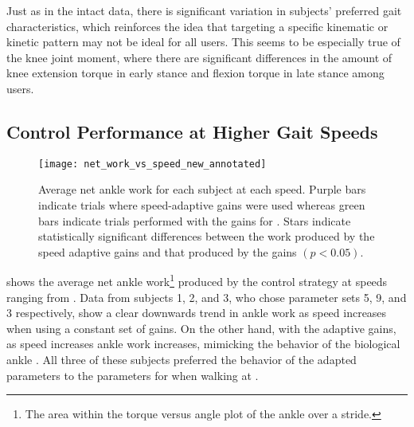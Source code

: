 Just as in the intact data, there is significant variation in subjects'
preferred gait characteristics, which reinforces the idea that targeting a
specific kinematic or kinetic pattern may not be ideal for all users. This seems
to be especially true of the knee joint moment, where there are significant
differences in the amount of knee extension torque in early stance and flexion
torque in late stance among users. 

\begin{comment}
We found that most subjects produced relatively little ankle dorsiflexion as
they walked. Consequently, for most subjects the neuromuscular model control
produced less ankle plantarflexion torque than is average for able-bodied
subjects.  We believe the low level of ankle dorsiflexion was caused by the
relatively short foot of the prosthesis, which we plan to rectify for future
experiments. However, this effect also betrays a potential weakness of the
approach: optimizing to match able-bodied kinetics given able-bodied kinematics
may not be able to rectify some types of discrepancies between the human and
the prosthesis.
\end{comment}

\subsection{Control Performance at Higher Gait Speeds}
\begin{figure}
    \centering
    \texttt{[image: net\_work\_vs\_speed\_new\_annotated]}
    \caption[Average net ankle work for each subject at each speed]{Average net
    ankle work for each subject at each speed. Purple bars indicate trials where
    speed-adaptive gains were used whereas green bars indicate trials performed
    with the gains for . Stars indicate statistically
    significant differences between the work produced by the speed adaptive
    gains and that produced by the  gains $(p <
    0.05)$.}\label{fig:net_work_vs_speed}
\end{figure}

 shows the average net ankle work\footnote{The area
within the torque versus angle plot of the ankle over a stride.} produced by the
control strategy at speeds ranging from . Data from
subjects 1, 2, and 3, who chose parameter sets 5, 9, and 3 respectively, show a
clear downwards trend in ankle work as speed increases when using a constant set
of gains. On the other hand, with the adaptive gains, as speed increases ankle
work increases, mimicking the behavior of the biological ankle
\citep{herr2012bionic}. All three of these subjects preferred the behavior of
the adapted parameters to the parameters for  when walking
at .

